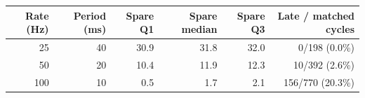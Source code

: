 \begin{tabular}{@{}rrrrrr@{}}
\toprule
Rate (Hz) & Period (ms) & Spare Q1 & Spare median & Spare Q3 & Late / matched cycles \\
\midrule
25 & 40 & 30.9 & 31.8 & 32.0 & 0/198 (0.0\%) \\
50 & 20 & 10.4 & 11.9 & 12.3 & 10/392 (2.6\%) \\
100 & 10 & 0.5 & 1.7 & 2.1 & 156/770 (20.3\%) \\
\bottomrule
\end{tabular}
